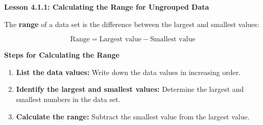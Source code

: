   \begin{center}
\textbf{Lesson 4.1.1: Calculating the Range for Ungrouped Data}
\end{center}

\vspace*{1ex}

The \textbf{range} of a data set is the difference between the largest and smallest values:

\[
\text{Range} = \text{Largest value} - \text{Smallest value}
\]

\noindent\textbf{Steps for Calculating the Range}

\begin{enumerate}
    \item \textbf{List the data values:} Write down the data values in increasing order.
    \item \textbf{Identify the largest and smallest values:} Determine the largest and smallest numbers in the data set.
    \item \textbf{Calculate the range:} Subtract the smallest value from the largest value.
\end{enumerate}







